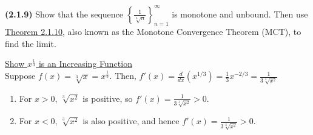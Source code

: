 \documentclass[12pt]{article}
\newcommand{\set}[1]{\left\{ {#1} \right\}}
\begin{document}
\newpage

\noindent \textbf{(2.1.9)} Show that the sequence $\set{\frac{1}{\sqrt[3]{n}}}_{n=1}^\infty$ is monotone and unbound. Then use \underline{Theorem 2.1.10}, also known as the Monotone Convergence Theorem (MCT), to find the limit.

\noindent \underline{Show $x^\frac{1}{3}$ is an Increasing Function} \\
\noindent Suppose $f(x)=\sqrt[3]{x}=x^\frac{1}{3}$. Then, $f'(x) = \frac{d}{dx}\left(x^{1/3}\right) = \frac{1}{3}x^{-2/3} = \frac{1}{3\sqrt[3]{x^2}}$

\begin{enumerate}
	\item For  $x > 0$, $\sqrt[3]{x^2}$ is positive, so $f'(x) = \frac{1}{3\sqrt[3]{x^2}} > 0.$
	\item 
For $x < 0$, $\sqrt[3]{x^2}$ is also positive, and hence $f'(x) = \frac{1}{3\sqrt[3]{x^2}} > 0.$
\end{enumerate}
\end{document}
